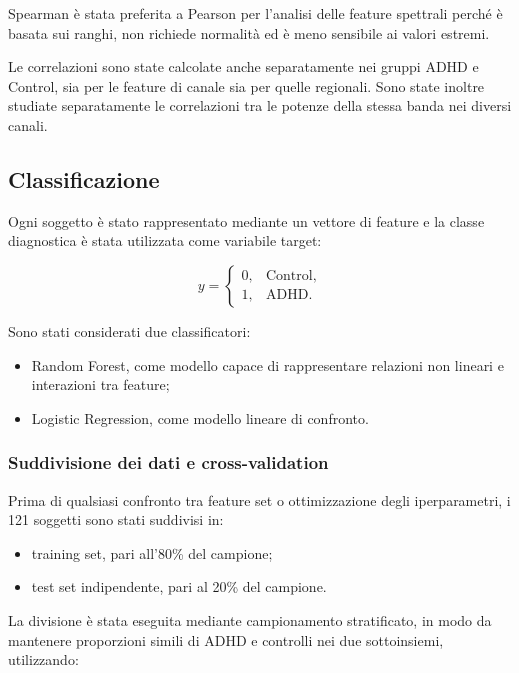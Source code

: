 Spearman è stata preferita a Pearson per l'analisi delle feature
spettrali perché è basata sui ranghi, non richiede normalità ed è meno
sensibile ai valori estremi.

Le correlazioni sono state calcolate anche separatamente nei gruppi
ADHD e Control, sia per le feature di canale sia per quelle regionali.
Sono state inoltre studiate separatamente le correlazioni tra le
potenze della stessa banda nei diversi canali.


\subsection{Classificazione}

Ogni soggetto è stato rappresentato mediante un vettore di feature e
la classe diagnostica è stata utilizzata come variabile target:

\begin{equation}
	y=
	\begin{cases}
		0, & \text{Control},\\
		1, & \text{ADHD}.
	\end{cases}
\end{equation}

Sono stati considerati due classificatori:

\begin{itemize}
	\item Random Forest, come modello capace di rappresentare
	relazioni non lineari e interazioni tra feature;
	
	\item Logistic Regression, come modello lineare di confronto.
\end{itemize}


\subsubsection{Suddivisione dei dati e cross-validation}

Prima di qualsiasi confronto tra feature set o ottimizzazione degli
iperparametri, i 121 soggetti sono stati suddivisi in:

\begin{itemize}
	\item training set, pari all'80\% del campione;
	\item test set indipendente, pari al 20\% del campione.
\end{itemize}

La divisione è stata eseguita mediante campionamento stratificato, in
modo da mantenere proporzioni simili di ADHD e controlli nei due
sottoinsiemi, utilizzando:

